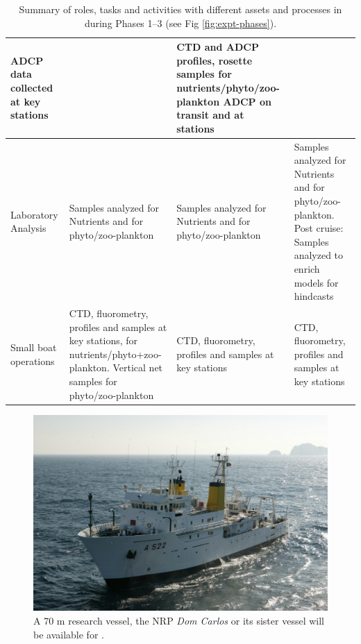 \begin{table}[!t]
{\begin{tabular}{|p{3cm}|p{4cm}|p{4cm}|p{4cm}|}
                             ADCP data collected at key stations&&CTD
                                                                   and
                                                                   ADCP profiles,
                                                                   rosette
                                                                   samples
                                                                   for
                                                                   nutrients/phyto/zoo-plankton
                                                                   ADCP on transit and at stations\\
    \hline
    Laboratory Analysis&Samples analyzed for Nutrients and
                         for phyto/zoo-plankton&Samples analyzed for Nutrients and
                         for phyto/zoo-plankton&Samples analyzed for Nutrients and
                         for phyto/zoo-plankton. Post cruise:
                                                  Samples analyzed to
                                                 enrich models for hindcasts\\
    \hline
    Small boat operations&CTD, fluorometry, profiles and samples at key
                           stations, for nutrients/phyto+zoo-plankton.
                           Vertical net samples for phyto/zoo-plankton&CTD, fluorometry, profiles and samples at key
                           stations&CTD, fluorometry, profiles and samples at key
                           stations\\
    \hline    
  \end{tabular}
  \caption{Summary of roles, tasks and activities with different assets
    and processes in \proj during Phases 1--3 (see Fig
    \ref{fig:expt-phases}).}
    \label{tab:tasks}
  }
\end{table}


\begin{figure}
  \centering
  \includegraphics[scale=1.75]{fig/dom-carlos.jpg}
  \caption{A 70 m \inst research vessel, the NRP \emph{Dom Carlos} or
    its sister vessel will be available for \proje.}
 \label{fig:vessel}
\end{figure}


